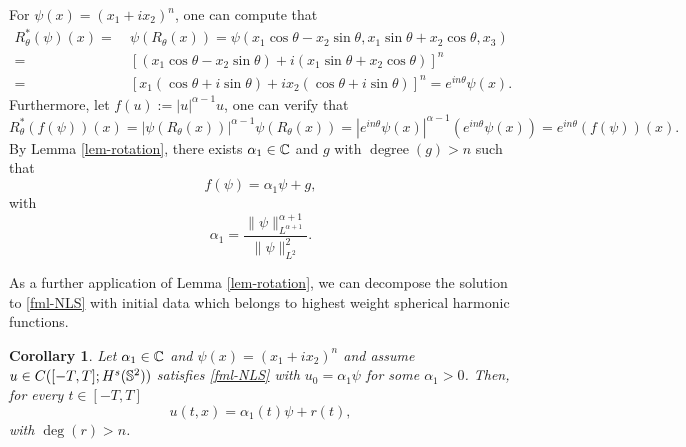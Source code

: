 \documentclass[11pt, reqno]{amsart}
\numberwithin{equation}{section}
\newtheorem{corollary}[theorem]{Corollary}
\theoremstyle{definition}
\theoremstyle{remark}
\begin{document}
{For $ \psi(x)=(x_1+ix_2)^n $, one can compute that
\begin{equation*}
\begin{aligned}
R_{\theta}^{*}(\psi)(x)= & ~ \psi(R_{\theta}(x))= \psi(x_1 \cos \theta - x_2 \sin \theta, x_1 \sin \theta + x_2 \cos \theta, x_3) \\
= & ~ [(x_1 \cos \theta - x_2 \sin \theta) + i (x_1 \sin \theta + x_2 \cos \theta)]^n \\
= & ~ [x_1 (\cos \theta + i \sin \theta) + i x_2 (\cos \theta + i \sin \theta)]^n= e^{in\theta} \psi(x).
\end{aligned}
\end{equation*}
Furthermore, let $f(u):= |u|^{\alpha-1} u$, one can verify that 
\begin{equation*}
R_{\theta}^{*}(f(\psi))(x) = |\psi(R_{\theta}(x))|^{\alpha-1} \psi(R_{\theta}(x)) = |e^{in\theta} \psi(x)|^{\alpha-1} (e^{in \theta} \psi(x)) = e^{in\theta}(f(\psi))(x).
\end{equation*}
By Lemma \ref{lem-rotation}, there exists $ \alpha_1 \in \Bbb C $ and $ g $ with $\operatorname{degree}(g)>n$ such that
\begin{equation*}
f(\psi) = \alpha_1 \psi + g,
\end{equation*}
with
\begin{equation*}
\alpha_1 = \frac{\|\psi\|^{\alpha+1}_{L^{\alpha+1}}}{\|\psi\|^2_{L^{2}}}.
\end{equation*}
	
As a further application of Lemma \ref{lem-rotation}, we can decompose the solution to \eqref{fml-NLS} with initial data which belongs to highest weight spherical harmonic functions.
\begin{corollary}\label{cor-decomp}
Let $\alpha_1\in\Bbb C$ and $\psi(x)=(x_1+ix_2)^n$ and assume $u\in C([-T,T];H^s(\Bbb S^2))$ satisfies \eqref{fml-NLS} with $u_0 = \alpha_1\psi$ for some $\alpha_1>0$. Then, for every $t\in [-T,T]$
\begin{equation*}
u(t,x) = \alpha_1(t)\psi + r(t),
\end{equation*}
with $\operatorname{deg}(r)>n$.
\end{corollary}
	
}
\end{document}
